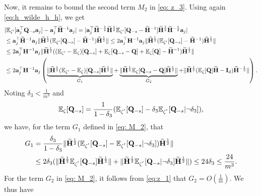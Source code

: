 \documentclass[11pt,a4paper]{article}
\begin{document}
Now, it remains to bound the second term $M_{2}$ in \eqref{eq: z_3}.  
Using again \eqref{eq:h_wilde_h_h}, we get
\begin{align}
  & | {\mathbb{E}}_{\zeta'}[\mathbf{a}_j^\top\mathbf{Q}_{-s}\mathbf{a}_j]-\mathbf{a}_j^\top\widetilde{\mathbf{H}}^{-1}\mathbf{a}_j|=|\mathbf{a}_j^\top \widetilde{\mathbf{H}}^{-\frac{1}{2}}\widetilde{\mathbf{H}}^{\frac{1}{2}}{\mathbb{E}}_{\zeta'}[\mathbf{Q}_{-s}-\widetilde{\mathbf{H}}^{-1}]\widetilde{\mathbf{H}}^{\frac{1}{2}}\widetilde{\mathbf{H}}^{-\frac{1}{2}}\mathbf{a}_j|\nonumber\\
   &\leq \mathbf{a}_j^\top \widetilde{\mathbf{H}}^{-1}\mathbf{a}_j\|\widetilde{\mathbf{H}}^{\frac{1}{2}}({\mathbb{E}}_{\zeta'}[\mathbf{Q}_{-s}]-\widetilde{\mathbf{H}}^{-1})\widetilde{\mathbf{H}}^{\frac{1}{2}}\|\leq 2\mathbf{a}_j^\top \mathbf{H}^{-1}\mathbf{a}_j\|\widetilde{\mathbf{H}}^{\frac{1}{2}}({\mathbb{E}}_{\zeta'}[\mathbf{Q}_{-s}]-\widetilde{\mathbf{H}}^{-1})\widetilde{\mathbf{H}}^{\frac{1}{2}}\|\nonumber\\
   &\leq 2\mathbf{a}_j^\top \mathbf{H}^{-1}\mathbf{a}_j\|\widetilde{\mathbf{H}}^{\frac{1}{2}}(({\mathbb{E}}_{\zeta'}-{\mathbb{E}}_{\zeta})[\mathbf{Q}_{-s}]+{\mathbb{E}}_{\zeta}[\mathbf{Q}_{-s}-\mathbf{Q}]+{\mathbb{E}}_{\zeta}[\mathbf{Q}]-\widetilde{\mathbf{H}}^{-1})\widetilde{\mathbf{H}}^{\frac{1}{2}}\|\nonumber\\
     &\leq 2\mathbf{a}_j^\top \mathbf{H}^{-1}\mathbf{a}_j\left(\underbrace{\|\widetilde{\mathbf{H}}^{\frac{1}{2}}({\mathbb{E}}_{\zeta'}-{\mathbb{E}}_{\zeta})[\mathbf{Q}_{-s}]\widetilde{\mathbf{H}}^{\frac{1}{2}}\|}_{G_1}+\underbrace{\|\widetilde{\mathbf{H}}^{\frac{1}{2}}{\mathbb{E}}_{\zeta}[\mathbf{Q}_{-s}-\mathbf{Q}]\widetilde{\mathbf{H}}^{\frac{1}{2}}\|}_{G_2}+\|\widetilde{\mathbf{H}}^{\frac{1}{2}}({\mathbb{E}}_{\zeta}[\mathbf{Q}]\widetilde{\mathbf{H}}-\mathbf{I}_d)\widetilde{\mathbf{H}}^{-\frac{1}{2}}\|\right). \label{eq: M_2}
\end{align}
Noting $\delta_3<\frac{1}{m^3}$ and   
\begin{align}
   {\mathbb{E}}_{\zeta}[\mathbf{Q}_{-s} ]=
   \frac{1}{1-\delta_3}({\mathbb{E}}_{\zeta^{'}}[\mathbf{Q}_{-s} ]-\delta_3{\mathbb{E}}_{\zeta^{'}}[ \mathbf{Q}_{-s}|\neg\delta_3 ]), \nonumber
\end{align}
we have, for the term $G_1$ defined in \eqref{eq: M_2}, that
\begin{align}
    G_1&=\frac{\delta_3}{1-\delta_3}\|\widetilde{\mathbf{H}}^{\frac{1}{2}}({\mathbb{E}}_{\zeta^{'}}[\mathbf{Q}_{-s} ]-{\mathbb{E}}_{\zeta^{'}}[ \mathbf{Q}_{-s}|\neg\delta_3 ])\widetilde{\mathbf{H}}^{\frac{1}{2}}\|\nonumber\\
    &\leq 2\delta_3(\|\widetilde{\mathbf{H}}^{\frac{1}{2}}{\mathbb{E}}_{\zeta^{'}}[\mathbf{Q}_{-s}] \widetilde{\mathbf{H}}^{\frac{1}{2}}\|+\|\widetilde{\mathbf{H}}^{\frac{1}{2}}{\mathbb{E}}_{\zeta^{'}}[ \mathbf{Q}_{-s}|\neg\delta_3 ]\widetilde{\mathbf{H}}^{\frac{1}{2}}\|)\leq 24\delta_3\leq\frac{24}{m^3}.\nonumber
\end{align}
For the term $G_2$ in \eqref{eq: M_2}, it follows from \eqref{eq:z_1} that $G_2 = O(\frac{1}{m})$. 
We thus have
\end{document}
